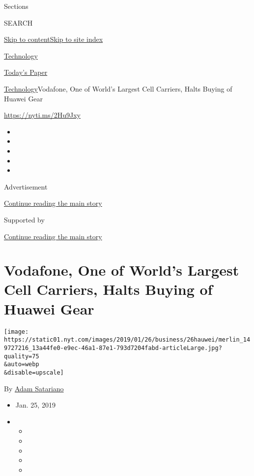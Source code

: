 Sections

SEARCH

\protect\hyperlink{site-content}{Skip to
content}\protect\hyperlink{site-index}{Skip to site index}

\href{https://www.nytimes.com/section/technology}{Technology}

\href{https://myaccount.nytimes.com/auth/login?response_type=cookie\&client_id=vi}{}

\href{https://www.nytimes.com/section/todayspaper}{Today's Paper}

\href{/section/technology}{Technology}\textbar{}Vodafone, One of World's
Largest Cell Carriers, Halts Buying of Huawei Gear

\url{https://nyti.ms/2Hu9Jxy}

\begin{itemize}
\item
\item
\item
\item
\item
\end{itemize}

Advertisement

\protect\hyperlink{after-top}{Continue reading the main story}

Supported by

\protect\hyperlink{after-sponsor}{Continue reading the main story}

\hypertarget{vodafone-one-of-worlds-largest-cell-carriers-halts-buying-of-huawei-gear}{%
\section{Vodafone, One of World's Largest Cell Carriers, Halts Buying of
Huawei
Gear}\label{vodafone-one-of-worlds-largest-cell-carriers-halts-buying-of-huawei-gear}}

\texttt{[image: https://static01.nyt.com/images/2019/01/26/business/26hauwei/merlin\_149727216\_13a44fe0-e9ec-46a1-87e1-793d7204fabd-articleLarge.jpg?quality=75\\\&auto=webp\\\&disable=upscale]}

By \href{https://www.nytimes.com/by/adam-satariano}{Adam Satariano}

\begin{itemize}
\item
  Jan. 25, 2019
\item
  \begin{itemize}
  \item
  \item
  \item
  \item
  \item
  \end{itemize}
\end{itemize}

